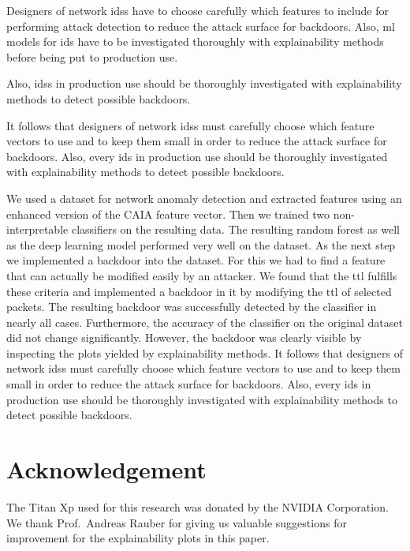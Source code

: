 \documentclass[10pt,sigconf,letterpaper,dvipsnames]{acmart}
\begin{document}
Designers of network \glspl{ids} have to choose carefully which features to include for performing attack detection to reduce the attack surface for backdoors. Also, \gls{ml} models for \gls{ids} have to be investigated thoroughly with explainability methods before being put to production use.

Also, \glspl{ids} in production use should be thoroughly investigated with explainability methods to detect possible backdoors.

It follows that designers of network \glspl{ids} must carefully choose which feature vectors to use and to keep them small in order to reduce the attack surface for backdoors. Also, every \gls{ids} in production use should be thoroughly investigated with explainability methods to detect possible backdoors.

We used a dataset for network anomaly detection and extracted features using an enhanced version of the CAIA feature vector. Then we trained two non-interpretable classifiers on the resulting data. The resulting random forest as well as the deep learning model performed very well on the dataset. As the next step we implemented a backdoor into the dataset. For this we had to find a feature that can actually be modified easily by an attacker. We found that the \gls{ttl} fulfills these criteria and implemented a backdoor in it by modifying the  \gls{ttl} of selected packets. The resulting backdoor was successfully detected by the classifier in nearly all cases. Furthermore, the accuracy of the classifier on the original dataset did not change significantly. However, the backdoor was clearly visible by inspecting the plots yielded by explainability methods. It follows that designers of network \glspl{ids} must carefully choose which feature vectors to use and to keep them small in order to reduce the attack surface for backdoors. Also, every \gls{ids} in production use should be thoroughly investigated with explainability methods to detect possible backdoors.

\section*{Acknowledgement}
The Titan Xp used for this research was donated by the NVIDIA Corporation. We thank Prof.~Andreas Rauber for giving us valuable suggestions for improvement for the explainability plots in this paper. 



\end{document}
